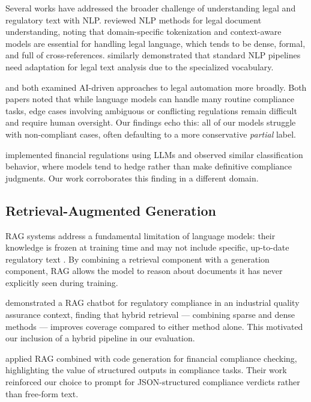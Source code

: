 Several works have addressed the broader challenge of understanding legal and regulatory text with NLP. \citet{Shinde2025} reviewed NLP methods for legal document understanding, noting that domain-specific tokenization and context-aware models are essential for handling legal language, which tends to be dense, formal, and full of cross-references. \citet{Singh2024} similarly demonstrated that standard NLP pipelines need adaptation for legal text analysis due to the specialized vocabulary.

\citet{Nithya2024} and \citet{Deshpande2024} both examined AI-driven approaches to legal automation more broadly. Both papers noted that while language models can handle many routine compliance tasks, edge cases involving ambiguous or conflicting regulations remain difficult and require human oversight. Our findings echo this: all of our models struggle with non-compliant cases, often defaulting to a more conservative \textit{partial} label.

\citet{Fazlija2024} implemented financial regulations using LLMs and observed similar classification behavior, where models tend to hedge rather than make definitive compliance judgments. Our work corroborates this finding in a different domain.

\subsection{Retrieval-Augmented Generation}

RAG systems address a fundamental limitation of language models: their knowledge is frozen at training time and may not include specific, up-to-date regulatory text \citep{Hillebrand2024}. By combining a retrieval component with a generation component, RAG allows the model to reason about documents it has never explicitly seen during training.

\citet{Hillebrand2024} demonstrated a RAG chatbot for regulatory compliance in an industrial quality assurance context, finding that hybrid retrieval — combining sparse and dense methods — improves coverage compared to either method alone. This motivated our inclusion of a hybrid pipeline in our evaluation.

\citet{Li2025} applied RAG combined with code generation for financial compliance checking, highlighting the value of structured outputs in compliance tasks. Their work reinforced our choice to prompt for JSON-structured compliance verdicts rather than free-form text.

